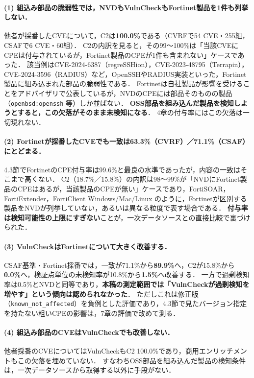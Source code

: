 \paragraph{(1) 組込み部品の脆弱性では，NVDもVulnCheckもFortinet製品を1件も列挙しない．}
他者が採番したCVEについて，C2は\textbf{100.0\%}である（CVRFで54 CVE・255組，CSAFで6 CVE・60組）．
C2の内訳を見ると，その99〜100\%は「当該CVEにCPEは付与されているが，Fortinet製品のCPEが1件も含まれない」ケースであった．
該当例はCVE-2024-6387（regreSSHion），CVE-2023-48795（Terrapin），CVE-2024-3596（RADIUS）など，OpenSSHやRADIUS実装といった，Fortinet製品に組み込まれた部品の脆弱性である．
Fortinetは自社製品が影響を受けることをアドバイザリで公表しているが，NVDのCPEには部品そのものの製品（\texttt{openbsd:openssh} 等）しか並ばない．
\textbf{OSS部品を組み込んだ製品を検知しようとすると，この欠落がそのまま未検知になる}．
4章の付与率にはこの欠落は一切現れない．

\paragraph{(2) Fortinetが採番したCVEでも一致は63.3\%（CVRF）／71.1\%（CSAF）にとどまる．}
4.3節でFortinetのCPE付与率は99.6\%と最良の水準であったが，内容の一致はそこまで高くない．
C2（18.7\%／15.8\%）の内訳は98〜99\%が「NVDにFortinet製品のCPEはあるが，当該製品のCPEが無い」ケースであり，FortiSOAR，FortiExtender，FortiClient Windows/Mac/Linux のように，Fortinetが区別する製品をNVDが列挙していない，あるいは異なる粒度で表す場合である．
\textbf{付与率は検知可能性の上限にすぎない}ことが，一次データソースとの直接比較で裏づけられた．

\paragraph{(3) VulnCheckはFortinetについて大きく改善する．}
CSAF基準・Fortinet採番では，一致が71.1\%から\textbf{89.9\%}へ，C2が15.8\%から\textbf{0.0\%}へ，検証点単位の未検知率が10.8\%から\textbf{1.5\%}へ改善する．
一方で過剰検知率は0.5\%とNVDと同等であり，\textbf{本稿の測定範囲では「VulnCheckが過剰検知を増やす」という傾向は認められなかった}．
ただしこれは修正版（\texttt{known\_not\_affected}）を負例とした評価であり，4.3節で見たバージョン指定を持たない粗いCPEの影響は，7章の評価で改めて測る．

\paragraph{(4) 組込み部品のCVEはVulnCheckでも改善しない．}
他者採番のCVEについてはVulnCheckもC2 100.0\%であり，商用エンリッチメントもこの欠落を埋めていない．
すなわちOSS部品を組み込んだ製品の検知条件は，一次データソースから取得する以外に手段がない．

